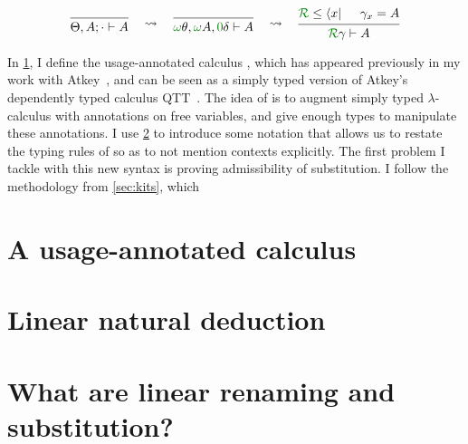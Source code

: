 \[
  \begin{prooftree}
    \infer0{\Theta, A; {\cdot} \vdash A}
  \end{prooftree}
  \quad\rightsquigarrow\quad
  \begin{prooftree}
    \infer0{\gr\omega\theta, \gr\omega A, \gr0\delta \vdash A}
  \end{prooftree}
  \quad\rightsquigarrow\quad
  \begin{prooftree}
    \hypo{\grR \leq \bra x}
    \hypo{\gamma_x = A}
    \infer2{\grR\gamma \vdash A}
  \end{prooftree}
\]


In \cref{sec:lr}, I define the usage-annotated calculus \name{}, which has
appeared previously in my work with Atkey~\cite{WA20}, and can be seen as a
simply typed version of Atkey's dependently typed calculus QTT~\cite{Atkey18}.
The idea of \name{} is to augment simply typed $\lambda$-calculus with
annotations on free variables, and give enough types to manipulate these
annotations.
I use \cref{sec:lnd} to introduce some notation that allows us to restate the
typing rules of \name{} so as to not mention contexts explicitly.
The first problem I tackle with this new syntax is proving admissibility of
substitution.
I follow the methodology from \cref{sec:kits}, which

\section{A usage-annotated calculus}\label{sec:lr}

\section{Linear natural deduction}\label{sec:lnd}

\section{What are linear renaming and substitution?}\label{sec:lrkits}

